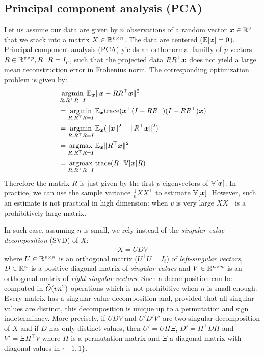 \subsection{Principal component analysis (PCA)}
Let us assume our data are given by $n$ observations of a random vector $\boldsymbol{x} \in
\mathbb{R}^{v}$ that we stack into a matrix $X \in \mathbb{R}^{v \times n}$. The data
are centered ($\mathbb{E}[\boldsymbol{x}] = 0$). Principal component analysis (PCA) yields an
orthonormal familly of $p$ vectors $R \in \mathbb{R}^{v \times p}, R^{\top} R
= I_p$, such that the projected data $R R^{\top} \boldsymbol{x}$ does not yield a large mean reconstruction error in Frobenius
norm.
The corresponding optimization problem is given by:
\begin{align}
  &\operatorname*{argmin}_{R, R^{\top}R = I} \mathbb{E}_{\boldsymbol{x}}\|\boldsymbol{x} - R R^{\top} \boldsymbol{x} \|^2 \\
  &=\operatorname*{argmin}_{R, R^{\top}R = I} \mathbb{E}_{\boldsymbol{x}} {\mathrm{ trace}}(  \boldsymbol{x}^{\top}(I - R R^{\top}) (I - R R^{\top}) \boldsymbol{x}) \\
  &= \operatorname*{argmin}_{R, R^{\top}R = I} \mathbb{E}_{\boldsymbol{x}}(\|\boldsymbol{x} \|^2 - \|R^{\top} \boldsymbol{x} \|^2) \\
  &= \operatorname*{argmax}_{R, R^{\top}R = I} \mathbb{E}_{\boldsymbol{x}} \|R^{\top} \boldsymbol{x} \|^2 \\
  &= \operatorname*{argmax}_{R, R^{\top}R = I} {\mathrm{ trace}}(R^{\top} \mathbb{V}[\boldsymbol{x}] R)
\end{align}
Therefore the matrix $R$ is just given by the first $p$ eigenvectors of
$\mathbb{V}[\boldsymbol{x}]$. In practice, we can use the sample variance $\frac1{n}X X^{\top}$ to estimate $\mathbb{V}[\boldsymbol{x}]$.
%
However, such an estimate is not practical in high dimension: when $v$ is very
large $XX^{\top}$ is a prohibitively large matrix.

In such case, assuming $n$ is small, we rely instead of the \emph{singular value
  decomposition} (SVD) of $X$:
\begin{align}
X= U D V
\end{align}
  where $U \in \mathbb{R}^{v \times n}$ is an orthogonal matrix ($U^{\top} U
= I_t$) of
\emph{left-singular vectors}, $D \in \mathbb{R}^{n}$ is a positive diagonal matrix of
\emph{singular values} and $V \in \mathbb{R}^{n \times n}$ is an orthogonal matrix of
\emph{right-singular vectors}. Such a decomposition can be computed in $\tilde{O}(v
n^2)$ operations which is not prohibitive when $n$ is small enough.
%
Every matrix has a singular value decomposition and, provided that all singular
values are distinct, this decomposition is unique up to a permutation and sign
indeterminacy.
More precisely, if $UDV$ and $U'D'V'$ are two singular decomposition of $X$ and
if $D$ has only distinct values, then $U'=U\Pi\Xi$, $D'=\Pi^{\top}D\Pi$ and $V'
= \Xi \Pi^{\top} V$ where $\Pi$ is a permutation matrix and $\Xi$ a diagonal
matrix with diagonal values in $\{-1, 1\}$.

